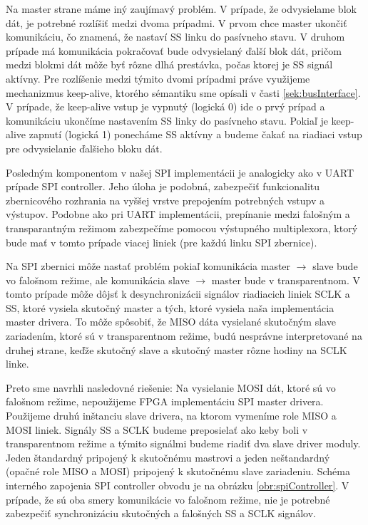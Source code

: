 Na master strane máme iný zaujímavý problém. V prípade, že odvysielame blok dát, je potrebné rozlíšiť medzi dvoma prípadmi. V prvom chce master ukončiť komunikáciu, čo znamená, že nastaví SS linku do pasívneho stavu. V druhom prípade má komunikácia pokračovať bude odvysielaný ďalší blok dát, pričom medzi blokmi dát môže byť rôzne dlhá prestávka, počas ktorej je SS signál aktívny. Pre rozlíšenie medzi týmito dvomi prípadmi práve využijeme mechanizmus keep-alive, ktorého sémantiku sme opísali v časti \ref{sek:busInterface}. V prípade, že keep-alive vstup je vypnutý (logická 0) ide o prvý prípad a komunikáciu ukončíme nastavením SS linky do pasívneho stavu. Pokiaľ je  keep-alive zapnutí (logická 1) ponecháme SS aktívny a budeme čakať na riadiaci vstup pre odvysielanie ďalšieho bloku dát.

Posledným komponentom v našej SPI implementácii je analogicky ako v UART prípade SPI controller. Jeho úloha je podobná, zabezpečiť funkcionalitu zbernicového rozhrania na vyššej vrstve prepojením potrebných vstupv a výstupov. Podobne ako pri UART implementácii, prepínanie medzi falošným a transparantným režimom zabezpečíme pomocou výstupného multiplexora, ktorý bude mať v tomto prípade viacej liniek (pre každú linku SPI zbernice).

Na SPI zbernici môže nastať problém pokiaľ komunikácia master $\to$ slave bude vo falošnom režime, ale komunikácia slave $\to$ master bude v transparentnom. V tomto prípade môže dôjsť k desynchronizácii signálov riadiacich liniek SCLK a SS, ktoré vysiela skutočný master a tých, ktoré vysiela naša implementácia master drivera. To môže spôsobiť, že MISO dáta vysielané skutočným slave zariadením, ktoré sú v transparentnom režime, budú nesprávne interpretované na druhej strane, keďže skutočný slave a skutočný master  rôzne hodiny na SCLK linke.

Preto sme navrhli nasledovné riešenie: Na vysielanie MOSI dát, ktoré sú vo falošnom režime, nepoužijeme FPGA implementáciu SPI master drivera. Použijeme druhú inštanciu slave drivera, na ktorom vymeníme role MISO a MOSI liniek. Signály SS a SCLK budeme preposielať ako keby boli v transparentnom režime a týmito signálmi budeme riadiť dva slave driver moduly. Jeden štandardný pripojený k skutočnému mastrovi a jeden neštandardný (opačné role MISO a MOSI) pripojený k skutočnému slave zariadeniu. Schéma interného zapojenia SPI controller obvodu je na obrázku \ref{obr:spiController}. V prípade, že sú oba smery komunikácie vo falošnom režime, nie je potrebné zabezpečiť synchronizáciu skutočných a falošných SS a SCLK signálov.

